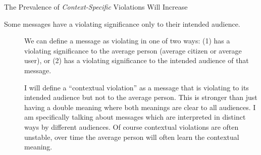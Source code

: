 \documentclass[
  10pt,
  ignorenonframetext,
]{beamer}
\begin{document}
\begin{frame}{The Prevalence of \emph{Context-Specific} Violations Will
Increase}
\label{the-prevalence-of-context-specific-violations-will-increase}
\begin{description}
\item[Some messages have a violating significance only to their intended
audience.]
We can define a message as violating in one of two ways: (1) has a
violating significance to the average person (average citizen or average
user), or (2) has a violating significance to the intended audience of
that message.

I will define a ``contextual violation'' as a message that is violating
to its intended audience but not to the average person. This is stronger
than just having a double meaning where both meanings are clear to all
audiences. I am specifically talking about messages which are
interpreted in distinct ways by different audiences. Of course
contextual violations are often unstable, over time the average person
will often learn the contextual meaning.
\end{description}
\end{frame}
\end{document}
